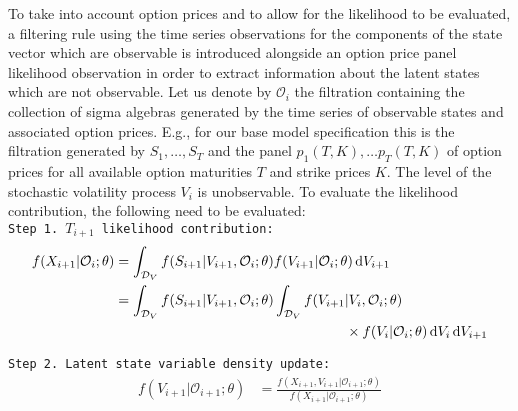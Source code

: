 \documentclass[11pt,a4paper,notitlepage]{article}
\numberwithin{equation}{section}
\begin{document}
To take into account option prices and to allow for the likelihood to be evaluated, a filtering rule using the time series observations for the components of the state vector which are observable is introduced alongside an option price panel likelihood observation in order to extract information about the latent states which are not observable.  Let us denote by $\mathcal{O}_i$ the filtration containing the collection of sigma algebras generated by the time series of observable states and associated option prices. E.g., for our base model specification this is the filtration generated by $S_{1},\dots,S_{T}$ and the panel $p_{1}(T,K),\dots  p_{T}(T,K)$ of option prices for all available option maturities $T$ and strike prices $K$. The level of the stochastic volatility process $V_{i}$ is unobservable. To evaluate the likelihood contribution, the following need to be evaluated:\vspace{+5pt}\\
\texttt{Step 1. $T_{i+1}$ likelihood contribution:} \vspace{-5pt}
\begin{align}
f(X_{i+1}|\mathcal{O}_{i};\theta) &=\int_{\mathcal{D}_{V}}  f(S_{i+1}|{V}_{i+1},\mathcal{O}_i;\theta) f(V_{i+1}|\mathcal{O}_i;\theta) \dif{V_{i+1}} \notag\\
&=\int_{\mathcal{D}_{V}} f(S_{i+1}|{V}_{i+1},\mathcal{O}_i; \theta) \int_{\mathcal{D}_{V}} f(V_{i+1}|{V}_{i},\mathcal{O}_i;\theta) \notag \\
& \hspace{165pt} \times f(V_{i}|\mathcal{O}_i; \theta)  \dif V_{i} \dif{V_{i+1}}\label{LikelihoodContribTheo}
\end{align}

\texttt{Step 2. Latent state variable density update:}\vspace{-5pt}
\begin{align}
f(V_{i+1}|\mathcal{O}_{i+1}; \theta) &= \frac{f(X_{i+1},V_{i+1}|\mathcal{O}_{i+1}; \theta)}{f(X_{i+1}|\mathcal{O}_{i+1}; \theta)} \label{SamplingDensityTheo}
\end{align}
%

\newpage

\nocite{*}

\end{document}
